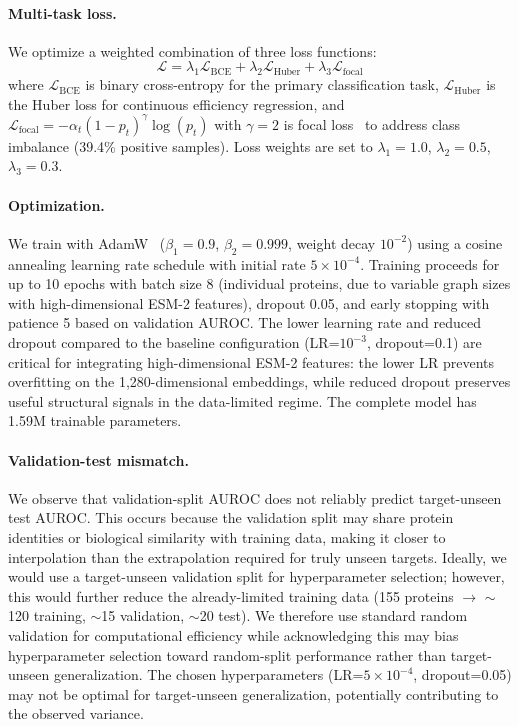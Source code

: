 \documentclass[sigconf]{acmart}
\begin{document}
\paragraph{Multi-task loss.}
We optimize a weighted combination of three loss functions:
\begin{equation}
    \mathcal{L} = \lambda_1 \mathcal{L}_{\text{BCE}} + \lambda_2 \mathcal{L}_{\text{Huber}} + \lambda_3 \mathcal{L}_{\text{focal}}
\end{equation}
where $\mathcal{L}_{\text{BCE}}$ is binary cross-entropy for the primary classification task, $\mathcal{L}_{\text{Huber}}$ is the Huber loss for continuous efficiency regression, and $\mathcal{L}_{\text{focal}} = -\alpha_t (1-p_t)^\gamma \log(p_t)$ with $\gamma = 2$ is focal loss~\cite{lin2017focal} to address class imbalance (39.4\% positive samples).
Loss weights are set to $\lambda_1 = 1.0$, $\lambda_2 = 0.5$, $\lambda_3 = 0.3$.

\paragraph{Optimization.}
We train with AdamW~\cite{loshchilov2019adamw} ($\beta_1\!=\!0.9$, $\beta_2\!=\!0.999$, weight decay $10^{-2}$) using a cosine annealing learning rate schedule with initial rate $5 \times 10^{-4}$.
Training proceeds for up to 10 epochs with batch size 8 (individual proteins, due to variable graph sizes with high-dimensional ESM-2 features), dropout 0.05, and early stopping with patience 5 based on validation AUROC.
The lower learning rate and reduced dropout compared to the baseline configuration (LR=$10^{-3}$, dropout=0.1) are critical for integrating high-dimensional ESM-2 features: the lower LR prevents overfitting on the 1,280-dimensional embeddings, while reduced dropout preserves useful structural signals in the data-limited regime.
The complete model has 1.59M trainable parameters.

\paragraph{Validation-test mismatch.}
We observe that validation-split AUROC does not reliably predict target-unseen test AUROC.
This occurs because the validation split may share protein identities or biological similarity with training data, making it closer to interpolation than the extrapolation required for truly unseen targets.
Ideally, we would use a target-unseen validation split for hyperparameter selection; however, this would further reduce the already-limited training data (155 proteins $\to$ ${\sim}$120 training, ${\sim}$15 validation, ${\sim}$20 test).
We therefore use standard random validation for computational efficiency while acknowledging this may bias hyperparameter selection toward random-split performance rather than target-unseen generalization.
The chosen hyperparameters (LR=$5{\times}10^{-4}$, dropout=0.05) may not be optimal for target-unseen generalization, potentially contributing to the observed variance.
\end{document}
